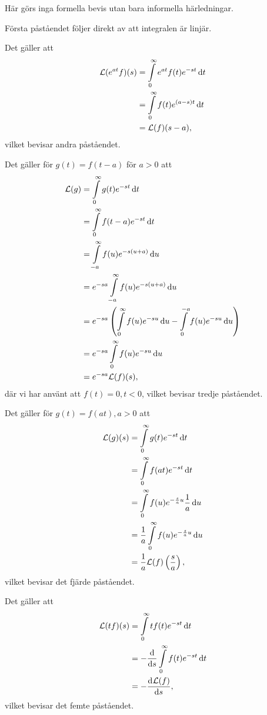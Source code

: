 \proof
Här görs inga formella bevis utan bara informella härledningar.

Första påståendet följer direkt av att integralen är linjär.

Det gäller att
\begin{align*}
	\mathcal{L}(e^{at}f)(s) &= \int\limits_{0}^{\infty}e^{at}f(t)e^{-st}\dd{t} \\
	                 &= \int\limits_{0}^{\infty}f(t)e^{(a - s)t}\dd{t} \\
	                 &= \mathcal{L}(f)(s - a),
\end{align*}
vilket bevisar andra påståendet.

Det gäller för $g(t) = f(t - a)$ för $a > 0$ att
\begin{align*}
	\mathcal{L}(g) &= \int\limits_{0}^{\infty}g(t)e^{-st}\dd{t} \\
	        &= \int\limits_{0}^{\infty}f(t - a)e^{-st}\dd{t} \\
	        &= \int\limits_{-a}^{\infty}f(u)e^{-s(u + a)}\dd{u} \\
	        &= e^{-sa}\int\limits_{-a}^{\infty}f(u)e^{-s(u + a)}\dd{u} \\
	        &= e^{-sa}\left(\int\limits_{0}^{\infty}f(u)e^{-su}\dd{u} - \int\limits_{0}^{-a}f(u)e^{-su}\dd{u}\right) \\
	        &= e^{-sa}\int\limits_{0}^{\infty}f(u)e^{-su}\dd{u} \\
	        &= e^{-sa}\mathcal{L}(f)(s),
\end{align*}
där vi har använt att $f(t) = 0, t < 0$, vilket bevisar tredje påståendet.

Det gäller för $g(t) = f(at), a > 0$ att
\begin{align*}
	\mathcal{L}(g)(s) &= \int\limits_{0}^{\infty}g(t)e^{-st}\dd{t} \\
	           &= \int\limits_{0}^{\infty}f(at)e^{-st}\dd{t} \\
	           &= \int\limits_{0}^{\infty}f(u)e^{-\frac{s}{a}u}\frac{1}{a}\dd{u} \\
	           &= \frac{1}{a}\int\limits_{0}^{\infty}f(u)e^{-\frac{s}{a}u}\dd{u} \\
	           &= \frac{1}{a}\mathcal{L}(f)\left(\frac{s}{a}\right),
\end{align*}
vilket bevisar det fjärde påståendet.

Det gäller att
\begin{align*}
	\mathcal{L}(tf)(s) &= \int\limits_{0}^{\infty}tf(t)e^{-st}\dd{t} \\
	            &= -\dv{s}\int\limits_{0}^{\infty}f(t)e^{-st}\dd{t} \\
	            &= -\dv[]{\mathcal{L}(f)}{s} (s),
\end{align*}
vilket bevisar det femte påståendet.


